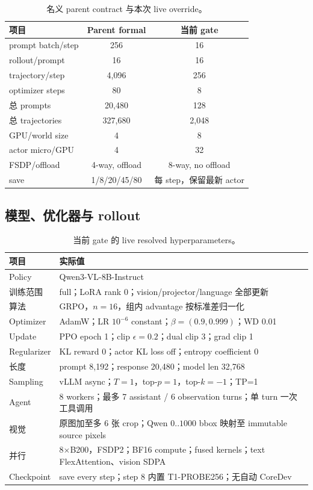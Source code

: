 \documentclass[UTF8,twocolumn,10pt,a4paper]{ctexart}
\begin{document}
\begin{table}[t]
\centering
\caption{名义 parent contract 与本次 live override。}
\label{tab:parent-live}
\scriptsize
\begin{tabularx}{\columnwidth}{Ycc}
\toprule
项目 & Parent formal & 当前 gate \\
\midrule
prompt batch/step & 256 & 16 \\
rollout/prompt & 16 & 16 \\
trajectory/step & 4,096 & 256 \\
optimizer steps & 80 & 8 \\
总 prompts & 20,480 & 128 \\
总 trajectories & 327,680 & 2,048 \\
GPU/world size & 4 & 8 \\
actor micro/GPU & 4 & 32 \\
FSDP/offload & 4-way, offload & 8-way, no offload \\
save & 1/8/20/45/80 & 每 step，保留最新 actor \\
\bottomrule
\end{tabularx}
\end{table}

\subsection{模型、优化器与 rollout}

\begin{table}[t]
\centering
\caption{当前 gate 的 live resolved hyperparameters。}
\label{tab:live-hp}
\scriptsize
\begin{tabularx}{\columnwidth}{lY}
\toprule
项目 & 实际值 \\
\midrule
Policy & Qwen3-VL-8B-Instruct \\
训练范围 & full；LoRA rank 0；vision/projector/language 全部更新 \\
算法 & GRPO，$n=16$，组内 advantage 按标准差归一化 \\
Optimizer & AdamW；LR $10^{-6}$ constant；$\beta=(0.9,0.999)$；WD 0.01 \\
Update & PPO epoch 1；clip $\epsilon=0.2$；dual clip 3；grad clip 1 \\
Regularizer & KL reward 0；actor KL loss off；entropy coefficient 0 \\
长度 & prompt 8,192；response 20,480；model len 32,768 \\
Sampling & vLLM async；$T=1$，top-$p=1$，top-$k=-1$；TP=1 \\
Agent & 8 workers；最多 7 assistant / 6 observation turns；单 turn 一次工具调用 \\
视觉 & 原图加至多 6 张 crop；Qwen $0..1000$ bbox 映射至 immutable source pixels \\
并行 & 8$\times$B200，FSDP2；BF16 compute；fused kernels；text FlexAttention、vision SDPA \\
Checkpoint & save every step；step 8 内置 T1-PROBE256；无自动 CoreDev \\
\bottomrule
\end{tabularx}
\end{table}
\end{document}
